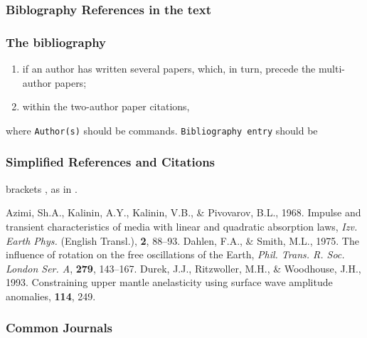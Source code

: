 \subsubsection{Biblography References in the text}

\subsubsection{The bibliography}

\begin{enumerate}
  \item if an author has written several papers,
        which, in turn, precede the multi-author papers;
  \item within the two-author paper citations,
\end{enumerate}
%
where \verb"Author(s)" should be commands. \verb"Bibliography entry" should be

\subsubsection{Simplified References and Citations}

brackets , as in .
\begin{references}
Azimi, Sh.A., Kalinin, A.Y., Kalinin, V.B., \& Pivovarov, B.L., 1968.
Impulse and transient characteristics of media with linear and  quadratic
absorption laws,
\textit{Izv. Earth Phys.} (English Transl.),
\textbf{2}, 88--93.
Dahlen, F.A., \& Smith, M.L., 1975.
The influence of rotation on the free oscillations of the Earth,
\textit{Phil. Trans. R. Soc. London Ser. A}, \textbf{279}, 143--167.
Durek, J.J., Ritzwoller, M.H., \& Woodhouse, J.H., 1993. Constraining upper
mantle anelasticity using surface wave amplitude anomalies, \gji{} \textbf{114},
249.
\end{references}

\subsubsection{Common Journals}

